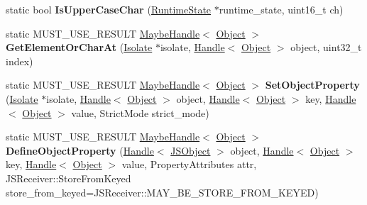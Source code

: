 \begin{DoxyCompactItemize}
\item 
\hypertarget{classv8_1_1internal_1_1_runtime_a9ef593232b15430dd7257e2ed862dbb9}{}static bool {\bfseries Is\+Upper\+Case\+Char} (\hyperlink{classv8_1_1internal_1_1_runtime_state}{Runtime\+State} $\ast$runtime\+\_\+state, uint16\+\_\+t ch)\label{classv8_1_1internal_1_1_runtime_a9ef593232b15430dd7257e2ed862dbb9}

\item 
\hypertarget{classv8_1_1internal_1_1_runtime_aaade21a4f5ed7ad67de2ff45f5debebd}{}static M\+U\+S\+T\+\_\+\+U\+S\+E\+\_\+\+R\+E\+S\+U\+L\+T \hyperlink{classv8_1_1internal_1_1_maybe_handle}{Maybe\+Handle}$<$ \hyperlink{classv8_1_1internal_1_1_object}{Object} $>$ {\bfseries Get\+Element\+Or\+Char\+At} (\hyperlink{classv8_1_1internal_1_1_isolate}{Isolate} $\ast$isolate, \hyperlink{classv8_1_1internal_1_1_handle}{Handle}$<$ \hyperlink{classv8_1_1internal_1_1_object}{Object} $>$ object, uint32\+\_\+t index)\label{classv8_1_1internal_1_1_runtime_aaade21a4f5ed7ad67de2ff45f5debebd}

\item 
\hypertarget{classv8_1_1internal_1_1_runtime_a3c308dd53a76554a7f2506556715268c}{}static M\+U\+S\+T\+\_\+\+U\+S\+E\+\_\+\+R\+E\+S\+U\+L\+T \hyperlink{classv8_1_1internal_1_1_maybe_handle}{Maybe\+Handle}$<$ \hyperlink{classv8_1_1internal_1_1_object}{Object} $>$ {\bfseries Set\+Object\+Property} (\hyperlink{classv8_1_1internal_1_1_isolate}{Isolate} $\ast$isolate, \hyperlink{classv8_1_1internal_1_1_handle}{Handle}$<$ \hyperlink{classv8_1_1internal_1_1_object}{Object} $>$ object, \hyperlink{classv8_1_1internal_1_1_handle}{Handle}$<$ \hyperlink{classv8_1_1internal_1_1_object}{Object} $>$ key, \hyperlink{classv8_1_1internal_1_1_handle}{Handle}$<$ \hyperlink{classv8_1_1internal_1_1_object}{Object} $>$ value, Strict\+Mode strict\+\_\+mode)\label{classv8_1_1internal_1_1_runtime_a3c308dd53a76554a7f2506556715268c}

\item 
\hypertarget{classv8_1_1internal_1_1_runtime_aa4e817e2bc79754016c1de5710b41575}{}static M\+U\+S\+T\+\_\+\+U\+S\+E\+\_\+\+R\+E\+S\+U\+L\+T \hyperlink{classv8_1_1internal_1_1_maybe_handle}{Maybe\+Handle}$<$ \hyperlink{classv8_1_1internal_1_1_object}{Object} $>$ {\bfseries Define\+Object\+Property} (\hyperlink{classv8_1_1internal_1_1_handle}{Handle}$<$ \hyperlink{classv8_1_1internal_1_1_j_s_object}{J\+S\+Object} $>$ object, \hyperlink{classv8_1_1internal_1_1_handle}{Handle}$<$ \hyperlink{classv8_1_1internal_1_1_object}{Object} $>$ key, \hyperlink{classv8_1_1internal_1_1_handle}{Handle}$<$ \hyperlink{classv8_1_1internal_1_1_object}{Object} $>$ value, Property\+Attributes attr, J\+S\+Receiver\+::\+Store\+From\+Keyed store\+\_\+from\+\_\+keyed=J\+S\+Receiver\+::\+M\+A\+Y\+\_\+\+B\+E\+\_\+\+S\+T\+O\+R\+E\+\_\+\+F\+R\+O\+M\+\_\+\+K\+E\+Y\+E\+D)\label{classv8_1_1internal_1_1_runtime_aa4e817e2bc79754016c1de5710b41575}


\end{DoxyCompactItemize}
